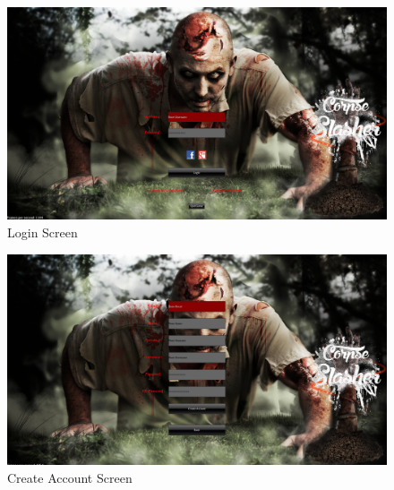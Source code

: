 \documentclass[letterpaper]{article}
\begin{document}
					
		\vspace{0.2in}
		
		\section*{\colorbox{black}{}} 
		\vspace{0.1in}
		
		\begin{figure}[H]
		\centering
		\includegraphics[width=130mm]		{GUI_ScreenShots/LoginScreen.jpg}
		\caption{Login Screen}
		\end{figure}
		

		
		\begin{figure}[H]
		\centering
		\includegraphics[width=130mm]{GUI_ScreenShots/CreateAccount.jpg}
		\caption{Create Account Screen}
		\end{figure}
		
\end{document}
